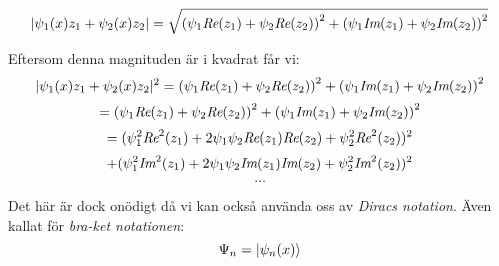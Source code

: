 \documentclass{article}
\begin{document}
$$
|\psi_1(x)z_1 + \psi_2(x)z_2| = \sqrt{ \left( \psi_1 \emph{Re}(z_1) + \psi_2 \emph{Re}(z_2) \right)^2 + \left( \psi_1 \emph{Im}(z_1) + \psi_2 \emph{Im}(z_2) \right)^2 }
$$

Eftersom denna magnituden är i kvadrat får vi:
$$
|\psi_1(x)z_1 + \psi_2(x)z_2|^2 = \left( \psi_1 \emph{Re}(z_1) + \psi_2 \emph{Re}(z_2) \right)^2 + \left( \psi_1 \emph{Im}(z_1) + \psi_2 \emph{Im}(z_2) \right)^2 
$$
$$
= \left( \psi_1 \emph{Re}(z_1) + \psi_2 \emph{Re}(z_2) \right)^2 + \left( \psi_1 \emph{Im}(z_1) + \psi_2 \emph{Im}(z_2) \right)^2 
$$
$$
= ( \psi_1^2 \emph{Re}^2(z_1) + 2\psi_1 \psi_2 \emph{Re}(z_1)\emph{Re}(z_2) + \psi_2^2 \emph{Re}^2(z_2) )^2 
$$
$$
+ ( \psi_1^2 \emph{Im}^2(z_1) + 2\psi_1 \psi_2 \emph{Im}(z_1)\emph{Im}(z_2) + \psi_2^2 \emph{Im}^2(z_2) )^2 
$$
$$
\dots
$$

Det här är dock onödigt då vi kan också använda oss av \emph{Diracs notation}. Även kallat för \emph{bra-ket notationen}:
$$
\Psi_n = \ket{\psi_n(x)}
$$
\end{document}
